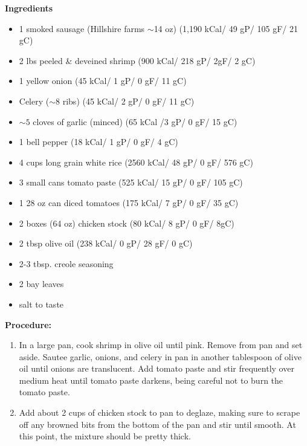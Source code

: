 \documentclass{report}
\begin{document}
\bigskip

\bigskip

\begin{multicols}{2}
\textbf{Ingredients}
\begin{itemize}
\item 1 smoked sausage (Hillshire farms $\sim$14 oz) \newline (1,190 kCal/ 49 gP/ 105 gF/ 21 gC)
\item 2 lbs peeled \& deveined shrimp \newline(900 kCal/ 218 gP/ 2gF/ 2 gC)
\item 1 yellow onion \quad (45 kCal/ 1 gP/ 0 gF/ 11 gC)
\item Celery ($\sim$8 ribs) \quad (45 kCal/ 2 gP/ 0 gF/ 11 gC)
\item $\sim 5$ cloves of garlic (minced) (65 kCal /3 gP/ 0 gF/ 15 gC)
\item 1 bell pepper \quad (18 kCal/ 1 gP/ 0 gF/ 4 gC)
\item 4 cups long grain white rice \quad (2560 kCal/ 48 gP/ 0 gF/ 576 gC)
\item 3 small cans tomato paste \quad (525 kCal/ 15 gP/ 0 gF/ 105 gC)
\item 1 28 oz can diced tomatoes \quad (175 kCal/ 7 gP/ 0 gF/ 35 gC)
\item 2 boxes (64 oz) chicken stock \quad (80 kCal/ 8 gP/ 0 gF/ 8gC)
\item 2 tbsp olive oil \quad (238 kCal/ 0 gP/ 28 gF/ 0 gC)
\item 2-3 tbsp. creole seasoning
\item 2 bay leaves 
\item salt to taste





\end{itemize}


\columnbreak
\textbf{Procedure:}
\medskip


\begin{enumerate}
\item In a large pan, cook shrimp in olive oil until pink. Remove from pan and set aside. Sautee garlic, onions, and celery in pan in another tablespoon of olive oil until onions are translucent. Add tomato paste and stir frequently over medium heat until tomato paste darkens, being careful not to burn the tomato paste.


\medskip
\item Add about 2 cups of chicken stock to pan to deglaze, making sure to scrape off any browned bits from the bottom of the pan and stir until smooth. At this point, the mixture should be pretty thick. 
\medskip


\end{enumerate}
\end{multicols}
\end{document}
